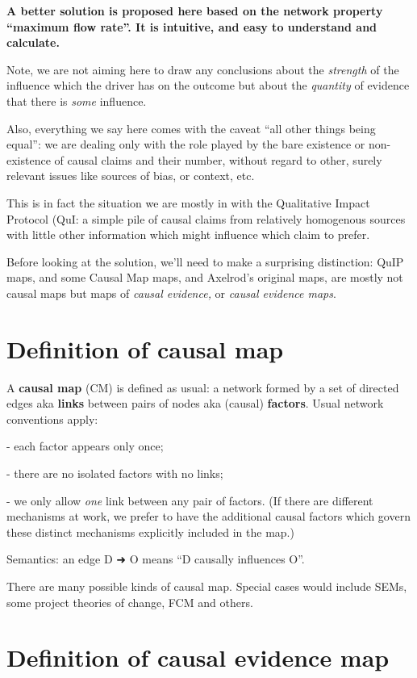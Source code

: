 \documentclass[
]{book}
\begin{document}
\textbf{A better solution is proposed here based on the network property ``maximum flow rate''. It is intuitive, and easy to understand and calculate.}

Note, we are not aiming here to draw any conclusions about the \emph{strength} of the influence which the driver has on the outcome but about the \emph{quantity} of evidence that there is \emph{some} influence.

Also, everything we say here comes with the caveat ``all other things being equal'': we are dealing only with the role played by the bare existence or non-existence of causal claims and their number, without regard to other, surely relevant issues like sources of bias, or context, etc.

This is in fact the situation we are mostly in with the Qualitative Impact Protocol (QuI: a simple pile of causal claims from relatively homogenous sources with little other information which might influence which claim to prefer.

Before looking at the solution, we'll need to make a surprising distinction: QuIP maps, and some Causal Map maps, and Axelrod's original maps, are mostly not causal maps but maps of \emph{causal evidence,} or \emph{causal evidence maps}.

\hypertarget{definition-of-causal-map}{%
\section{Definition of causal map}\label{definition-of-causal-map}}

A \textbf{causal map} (CM) is defined as usual: a network formed by a set of directed edges aka \textbf{links} between pairs of nodes aka (causal) \textbf{factors}. Usual network conventions apply:

- each factor appears only once;

- there are no isolated factors with no links;

- we only allow \emph{one} link between any pair of factors. (If there are different mechanisms at work, we prefer to have the additional causal factors which govern these distinct mechanisms explicitly included in the map.)

Semantics: an edge D ➜ O means ``D causally influences O''.

There are many possible kinds of causal map. Special cases would include SEMs, some project theories of change, FCM and others.

\hypertarget{definition-of-causal-evidence-map}{%
\section{Definition of causal evidence map}\label{definition-of-causal-evidence-map}}
\end{document}
